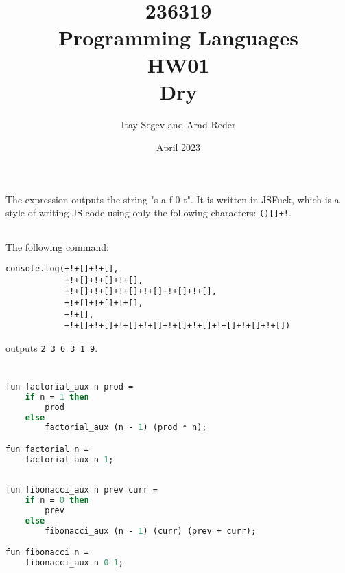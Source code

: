 \documentclass{article}
\title{%
       236319 \\
       Programming Languages \\
       \large HW01 \\
       \small Dry}
\author{Itay Segev and Arad Reder}
\date{April 2023}
\begin{document}
\maketitle

\section{}
\subsection{}
The expression outputs the string "s a f 0 t". It is written in JSFuck, which is a style of writing JS code using only the following characters: \lstinline{()[]+!}.
\subsection{}
The following command:
\begin{lstlisting}
console.log(+!+[]+!+[],
            +!+[]+!+[]+!+[],
            +!+[]+!+[]+!+[]+!+[]+!+[]+!+[],
            +!+[]+!+[]+!+[],
            +!+[],
            +!+[]+!+[]+!+[]+!+[]+!+[]+!+[]+!+[]+!+[]+!+[])
\end{lstlisting}
outputs \lstinline{2 3 6 3 1 9}.

\section{}
\subsection{}
\begin{lstlisting}[language=Pascal]
fun factorial_aux n prod = 
    if n = 1 then
        prod
    else
        factorial_aux (n - 1) (prod * n);

fun factorial n =
    factorial_aux n 1;
\end{lstlisting}

\subsection{}
\begin{lstlisting}[language=Pascal]
fun fibonacci_aux n prev curr =
    if n = 0 then
        prev
    else
        fibonacci_aux (n - 1) (curr) (prev + curr);

fun fibonacci n =
    fibonacci_aux n 0 1;
\end{lstlisting}

\section{}
\end{document}
